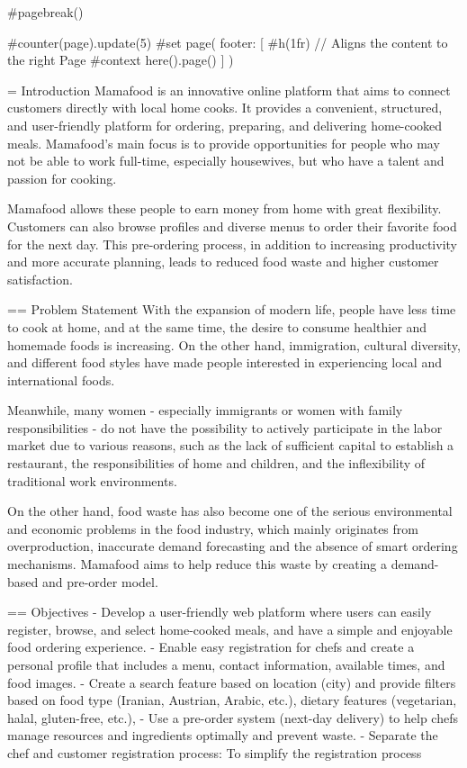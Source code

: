 #pagebreak()


#counter(page).update(5)
#set page(
  footer: [
    #h(1fr) // Aligns the content to the right
    Page #context here().page()
  ]
)



= Introduction
Mamafood is an innovative online platform that aims to connect customers directly with local home cooks. It provides a convenient, structured, and user-friendly platform for ordering, preparing, and delivering home-cooked meals. Mamafood’s main focus is to provide opportunities for people who may not be able to work full-time, especially housewives, but who have a talent and passion for cooking.

Mamafood allows these people to earn money from home with great flexibility. Customers can also browse profiles and diverse menus to order their favorite food for the next day. This pre-ordering process, in addition to increasing productivity and more accurate planning, leads to reduced food waste and higher customer satisfaction.

== Problem Statement
With the expansion of modern life, people have less time to cook at home, and at the same time, the desire to consume healthier and homemade foods is increasing. On the other hand, immigration, cultural diversity, and different food styles have made people interested in experiencing local and international foods.

Meanwhile, many women - especially immigrants or women with family responsibilities - do not have the possibility to actively participate in the labor market due to various reasons, such as the lack of sufficient capital to establish a restaurant, the responsibilities of home and children, and the inflexibility of traditional work environments.

On the other hand, food waste has also become one of the serious environmental and economic problems in the food industry, which mainly originates from overproduction, inaccurate demand forecasting and the absence of smart ordering mechanisms. Mamafood aims to help reduce this waste by creating a demand-based and pre-order model.

== Objectives
- Develop a user-friendly web platform where users can easily register, browse, and select home-cooked meals, and have a simple and enjoyable food ordering experience.
- Enable easy registration for chefs and create a personal profile that includes a menu, contact information, available times, and food images.
- Create a search feature based on location (city) and provide filters based on food type (Iranian, Austrian, Arabic, etc.), dietary features (vegetarian, halal, gluten-free, etc.),
- Use a pre-order system (next-day delivery) to help chefs manage resources and ingredients optimally and prevent waste.
- Separate the chef and customer registration process: To simplify the registration process

